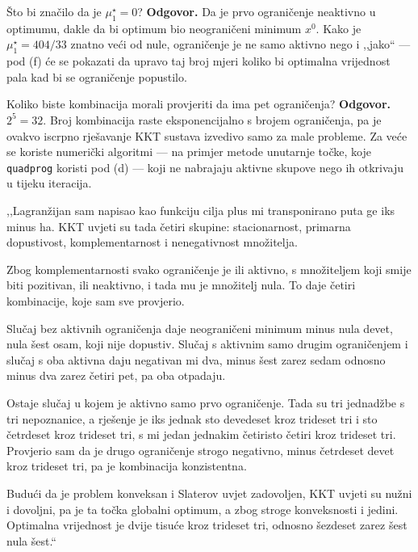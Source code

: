 \begin{pitanje}{Što bi značilo da je $\mu_1^{\star} = 0$?}
\textbf{Odgovor.} Da je prvo ograničenje neaktivno u optimumu, dakle da bi
optimum bio neograničeni minimum $x^{0}$. Kako je $\mu_1^{\star} = 404/33$ znatno
veći od nule, ograničenje je ne samo aktivno nego i ,,jako`` --- pod (f) će se
pokazati da upravo taj broj mjeri koliko bi optimalna vrijednost pala kad bi se
ograničenje popustilo.
\end{pitanje}

\begin{pitanje}{Koliko biste kombinacija morali provjeriti da ima pet ograničenja?}
\textbf{Odgovor.} $2^5 = 32$. Broj kombinacija raste eksponencijalno s brojem
ograničenja, pa je ovakvo iscrpno rješavanje KKT sustava izvedivo samo za male
probleme. Za veće se koriste numerički algoritmi --- na primjer metode unutarnje
točke, koje \texttt{quadprog} koristi pod (d) --- koji ne nabrajaju aktivne
skupove nego ih otkrivaju u tijeku iteracija.
\end{pitanje}

\begin{izgovor}
,,Lagranžijan sam napisao kao funkciju cilja plus mi transponirano puta ge iks
minus ha. KKT uvjeti su tada četiri skupine: stacionarnost, primarna
dopustivost, komplementarnost i nenegativnost množitelja.

Zbog komplementarnosti svako ograničenje je ili aktivno, s množiteljem koji
smije biti pozitivan, ili neaktivno, i tada mu je množitelj nula. To daje četiri
kombinacije, koje sam sve provjerio.

Slučaj bez aktivnih ograničenja daje neograničeni minimum minus nula devet,
nula šest osam, koji nije dopustiv. Slučaj s aktivnim samo drugim ograničenjem i
slučaj s oba aktivna daju negativan mi dva, minus šest zarez sedam odnosno minus
dva zarez četiri pet, pa oba otpadaju.

Ostaje slučaj u kojem je aktivno samo prvo ograničenje. Tada su tri jednadžbe s
tri nepoznanice, a rješenje je iks jednak sto devedeset kroz trideset tri i sto
četrdeset kroz trideset tri, s mi jedan jednakim četiristo četiri kroz trideset
tri. Provjerio sam da je drugo ograničenje strogo negativno, minus četrdeset
devet kroz trideset tri, pa je kombinacija konzistentna.

Budući da je problem konveksan i Slaterov uvjet zadovoljen, KKT uvjeti su nužni i
dovoljni, pa je ta točka globalni optimum, a zbog stroge konveksnosti i jedini.
Optimalna vrijednost je dvije tisuće kroz trideset tri, odnosno šezdeset zarez
šest nula šest.``
\end{izgovor}
